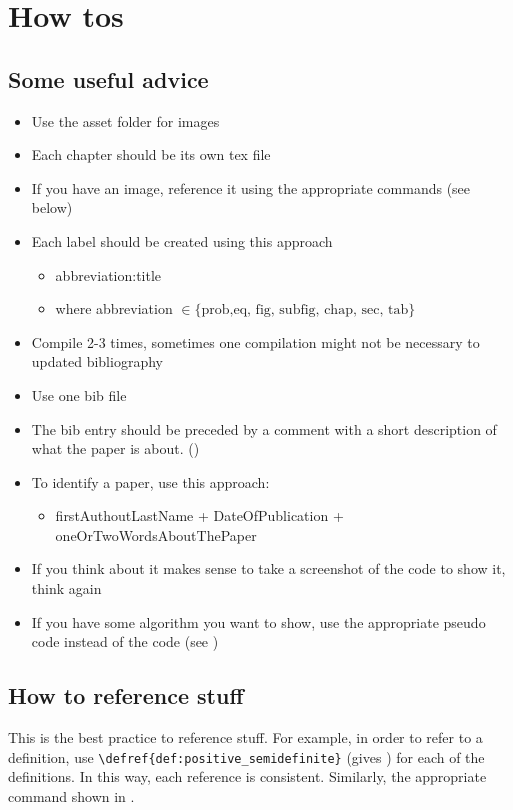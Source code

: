 \chapter{How tos}\label{chap:how_tos}


\section{Some useful advice}
\begin{itemize}
	\item Use the asset folder for images
	\item Each chapter should be its own tex file
	\item If you have an image, reference it using the appropriate commands (see below)
	\item Each label should be created using this approach
	\begin{itemize}
		\item[] abbreviation:title
		\item[] where abbreviation $\in \{\text{prob,eq, fig, subfig, chap, sec, tab}\}$
	\end{itemize}
		\item Compile 2-3 times, sometimes one compilation might not be necessary to updated bibliography
	\item Use one bib file
	\item The bib entry should be preceded by a comment with a short description of what the paper is about. (\cite{Brodo2022NNAnalysis})
	\item To identify a paper, use this approach:
			\begin{itemize}
				\item[] firstAuthoutLastName + DateOfPublication + oneOrTwoWordsAboutThePaper
			\end{itemize}
	\item If you think about it makes sense to take a screenshot of the code to show it, think again
	\item If you have some algorithm you want to show, use the appropriate pseudo code instead of the code (see )
\end{itemize}




\section{How to reference stuff}\label{sec:general_definitions}
This is the best practice to reference stuff. For example, in order to refer to a definition, use \verb|\defref{def:positive_semidefinite}| (gives ) for each of the definitions. In this way, each reference is consistent. Similarly, the appropriate command shown in .

